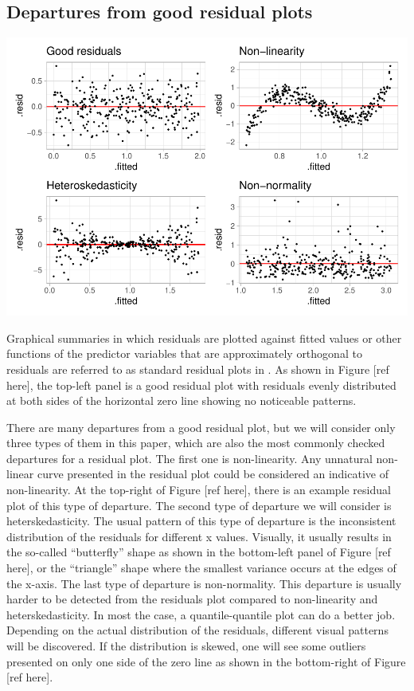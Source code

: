 \documentclass[]{interact}
\theoremstyle{plain}%
\theoremstyle{definition}
\theoremstyle{remark}
\begin{document}
\hypertarget{departures-from-good-residual-plots}{%
\subsection{Departures from good residual
plots}\label{departures-from-good-residual-plots}}

\includegraphics{paper_comparison_files/figure-latex/unnamed-chunk-6-1.pdf}

Graphical summaries in which residuals are plotted against fitted values
or other functions of the predictor variables that are approximately
orthogonal to residuals are referred to as standard residual plots in
\citet{cook1982residuals}. As shown in Figure {[}ref here{]}, the
top-left panel is a good residual plot with residuals evenly distributed
at both sides of the horizontal zero line showing no noticeable
patterns.

There are many departures from a good residual plot, but we will
consider only three types of them in this paper, which are also the most
commonly checked departures for a residual plot. The first one is
non-linearity. Any unnatural non-linear curve presented in the residual
plot could be considered an indicative of non-linearity. At the
top-right of Figure {[}ref here{]}, there is an example residual plot of
this type of departure. The second type of departure we will consider is
heterskedasticity. The usual pattern of this type of departure is the
inconsistent distribution of the residuals for different x values.
Visually, it usually results in the so-called ``butterfly'' shape as
shown in the bottom-left panel of Figure {[}ref here{]}, or the
``triangle'' shape where the smallest variance occurs at the edges of
the x-axis. The last type of departure is non-normality. This departure
is usually harder to be detected from the residuals plot compared to
non-linearity and heterskedasticity. In most the case, a
quantile-quantile plot can do a better job. Depending on the actual
distribution of the residuals, different visual patterns will be
discovered. If the distribution is skewed, one will see some outliers
presented on only one side of the zero line as shown in the bottom-right
of Figure {[}ref here{]}.
\end{document}

